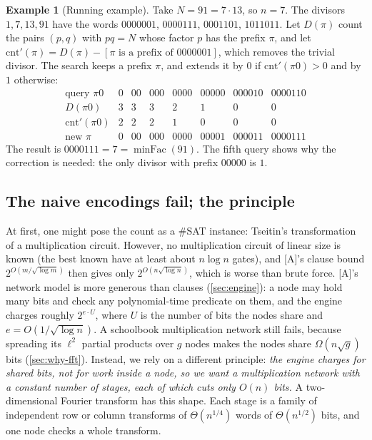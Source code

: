\documentclass[10pt]{amsart}
\theoremstyle{plain}
\theoremstyle{definition}
\newtheorem{example}[theorem]{Example}
\theoremstyle{remark}
\numberwithin{equation}{section}
\newcommand{\minFac}{\operatorname{minFac}}
\newcommand{\A}{\textup{[A]}}
\begin{document}
\begin{example}[Running example]\label{ex:91}
Take $N=91=7\cdot13$, so $n=7$. The divisors $1,7,13,91$ have the words $0000001$, $0000111$,
$0001101$, $1011011$. Let $D(\pi)$ count the pairs $(p,q)$ with $pq=N$ whose factor $p$ has the prefix
$\pi$, and let $\mathrm{cnt}'(\pi)=D(\pi)-[\pi\text{ is a prefix of }0000001]$, which removes the trivial
divisor. The search keeps a prefix $\pi$, and extends it by $0$ if $\mathrm{cnt}'(\pi0)>0$ and by $1$
otherwise:
\[
\begin{array}{l|ccccccc}
\text{query } \pi0 & 0 & 00 & 000 & 0000 & 00000 & 000010 & 0000110\\\hline
D(\pi0) & 3 & 3 & 3 & 2 & 1 & 0 & 0\\
\mathrm{cnt}'(\pi0) & 2 & 2 & 2 & 1 & 0 & 0 & 0\\
\text{new } \pi & 0 & 00 & 000 & 0000 & 00001 & 000011 & 0000111
\end{array}
\]
The result is $0000111=7=\minFac(91)$. The fifth query shows why the correction is needed: the only
divisor with prefix $00000$ is $1$.
\end{example}

\subsection{The naive encodings fail; the principle}
At first, one might pose the count as a $\#$SAT instance: Tseitin's transformation of a multiplication
circuit. However, no multiplication circuit of linear size is known (the best known have at least about
$n\log n$ gates), and \A's clause bound $2^{O(m/\sqrt{\log m})}$ then gives only $2^{O(n\sqrt{\log n})}$, which is
worse than brute force. \A's network model is more generous than clauses (\cref{sec:engine}): a node may
hold many bits and check any polynomial-time predicate on them, and the engine charges roughly
$2^{e\cdot U}$, where $U$ is the number of bits the nodes share and $e=O(1/\sqrt{\log n})$. A schoolbook
multiplication network still fails, because spreading its $\ell^2$ partial products over $g$ nodes makes
the nodes share $\Omega(n\sqrt g)$ bits (\cref{sec:why-fft}). Instead, we rely on a different principle:
\emph{the engine charges for shared bits, not for work inside a node, so we want a multiplication
network with a constant number of stages, each of which cuts only $O(n)$ bits.} A two-dimensional Fourier
transform has this shape. Each stage is a family of independent row or column transforms of
$\Theta(n^{1/4})$ words of $\Theta(n^{1/2})$ bits, and one node checks a whole transform.
\end{document}
